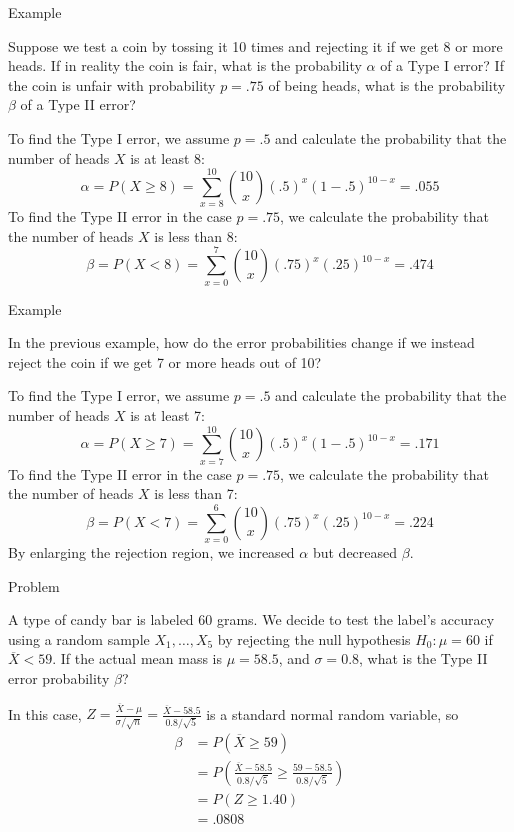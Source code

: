 \documentclass[t,handout]{beamer}
\begin{document}
\begin{frame}{Example}
    \begin{block}{}
    Suppose we test a coin by tossing it 10 times and rejecting it if we get 8 or more heads. If in reality the coin is fair, what is the probability $\alpha$ of a Type I error? If the coin is unfair with probability $p=.75$ of being heads, what is the probability $\beta$ of a Type II error?
    \end{block}
    \pause To find the Type I error, we assume $p=.5$ and calculate the probability that the number of heads $X$ is at least 8:
    \pause $$\alpha = P(X \geq 8) = \sum_{x=8}^{10} \binom{10} x (.5)^x(1-.5)^{10-x}= .055$$
    \pause To find the Type II error in the case $p=.75$, we calculate the probability that the number of heads $X$ is less than 8:
    \pause $$\beta = P(X < 8) = \sum_{x=0}^7 \binom{10} x (.75)^x(.25)^{10-x} = .474$$
    \end{frame}
    
    \begin{frame}{Example}
    \begin{block}{}
    In the previous example, how do the error probabilities change if we instead reject the coin if we get 7 or more heads out of 10?
    \end{block}
    \pause To find the Type I error, we assume $p=.5$ and calculate the probability that the number of heads $X$ is at least 7:
    \pause $$\alpha = P(X \geq 7) = \sum_{x=7}^{10} \binom{10} x (.5)^x(1-.5)^{10-x}= .171$$
    \pause To find the Type II error in the case $p=.75$, we calculate the probability that the number of heads $X$ is less than 7:
    \pause $$\beta = P(X < 7) = \sum_{x=0}^6 \binom{10} x (.75)^x(.25)^{10-x} = .224$$
    By enlarging the rejection region, we increased $\alpha$ but decreased $\beta$.
    \end{frame}

    \begin{frame}{Problem}
        \begin{block}{}
        A type of candy bar is labeled 60 grams. We decide to test the label's accuracy using a random sample $X_1,\dots,X_5$ by rejecting the null hypothesis $H_0: \mu=60$ if $\overline X<59$. If the actual mean mass is $\mu=58.5$, and $\sigma=0.8$, what is the Type II error probability $\beta$?
        \end{block}
        
        \pause In this case, $Z=\frac{\overline X-\mu}{\sigma/\sqrt{n}}=\frac{\overline X-58.5}{0.8/\sqrt{5}}$ is a standard normal random variable, \pause so
        \begin{align*}
        \beta &= P(\overline X\geq 59) \\
        &= P\left(\frac{\overline X-58.5}{0.8/\sqrt5} \geq \frac{59-58.5}{0.8/\sqrt5}\right)\\
        &= P(Z \geq 1.40) \\
        &= .0808
        \end{align*}
        
        \end{frame}
\end{document}
